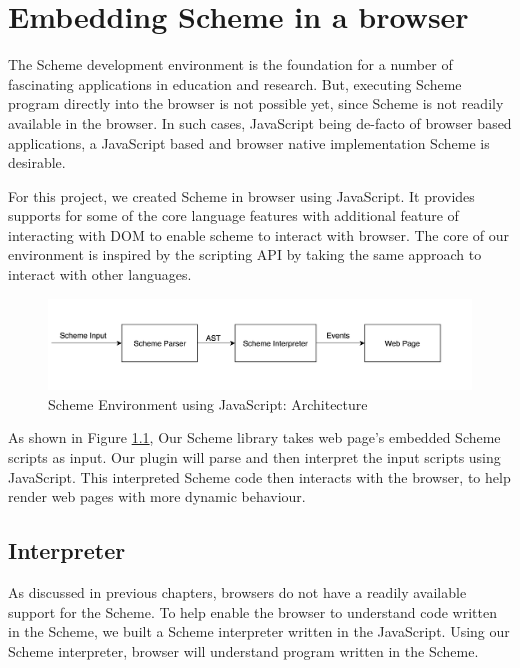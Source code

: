 \chapter{Embedding Scheme in a browser} \label{scheme}

The Scheme development environment is the foundation for a number of fascinating applications in education and research. But, executing Scheme program directly into the browser is not possible yet, since Scheme is not readily available in the browser. In such cases, JavaScript being de-facto of browser based applications, a JavaScript based and browser native implementation Scheme is desirable.

For this project, we created Scheme in browser using JavaScript. It provides supports for some of the core language features with additional feature of interacting with DOM to enable scheme to interact with browser.  The core of our environment is inspired by the scripting API \cite{javascripting} by taking the same approach to interact with other languages. 

\begin{figure}[ht]
	\begin{center}
		\includegraphics[width=\linewidth]{./images/SchemeEnvironmentusingJavaScript.png}
	\end{center}
	\caption{Scheme Environment using JavaScript: Architecture}
	\label{fig:SchemeEnvironmentusingJavaScript}
\end{figure}


As shown in Figure \ref{fig:SchemeEnvironmentusingJavaScript}, Our Scheme library takes web page's embedded Scheme scripts as input. Our plugin will parse and then interpret the input scripts using JavaScript. This interpreted Scheme code then interacts with the browser, to help render web pages with more dynamic behaviour. 

\section{Interpreter} 
As discussed in previous chapters, browsers do not have a readily available support for the Scheme. To help enable the browser to understand code written in the Scheme, we built a Scheme interpreter written in the JavaScript. Using our Scheme interpreter, browser will understand program written in the Scheme.

